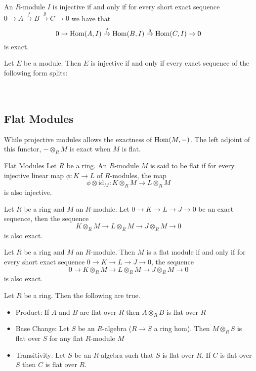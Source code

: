 \documentclass[a4paper]{article}
\begin{document}
\begin{thm}{}{} An $R$-module $I$ is injective if and only if for every short exact sequence $0\to A\overset{f}{\to}B\overset{g}{\to}C\to 0$ we have that $$0\to \operatorname{Hom}(A,I)\overset{f}{\to}\operatorname{Hom}(B,I)\overset{g}{\to}\operatorname{Hom}(C,I)\to 0$$
is exact. 
\end{thm}

\begin{prp}{}{} Let $E$ be a module. Then $E$ is injective if and only if every exact sequence of the following form splits: \\~\\
 \\
\end{prp}

\subsection{Flat Modules}
While projective modules allows the exactness of $\operatorname{Hom}(M,-)$. The left adjoint of this functor, $-\otimes_RM$ is exact when $M$ is flat. 

\begin{defn}{Flat Modules}{} Let $R$ be a ring. An $R$-module $M$ is said to be flat if for every injective linear map $\phi:K\to L$ of $R$-modules, the map $$\phi\otimes\text{id}_M:K\otimes_RM\to L\otimes_RM$$ is also injective. 
\end{defn}

\begin{thm}{}{} Let $R$ be a ring and $M$ an $R$-module. Let $0\to K\to L\to J\to 0$ be an exact sequence, then the sequence $$K\otimes_RM\to L\otimes_RM\to J\otimes_RM\to 0$$ is also exact. 
\end{thm}

\begin{thm}{}{} Let $R$ be a ring and $M$ an $R$-module. Then $M$ is a flat module if and only if for every short exact sequence $0\to K\to L\to J\to 0$, the sequence $$0\to K\otimes_RM\to L\otimes_RM\to J\otimes_RM\to 0$$ is also exact. 
\end{thm}

\begin{thm}{}{} Let $R$ be a ring. Then the following are true. 
\begin{itemize}
\item Product: If $A$ and $B$ are flat over $R$ then $A\otimes_R B$ is flat over $R$
\item Base Change: Let $S$ be an $R$-algebra ($R\to S$ a ring hom). Then $M\otimes_RS$ is flat over $S$ for any flat $R$-module $M$
\item Transitivity: Let $S$ be an $R$-algebra such that $S$ is flat over $R$. If $C$ is flat over $S$ then $C$ is flat over $R$. 
\end{itemize}
\end{thm}
\end{document}

